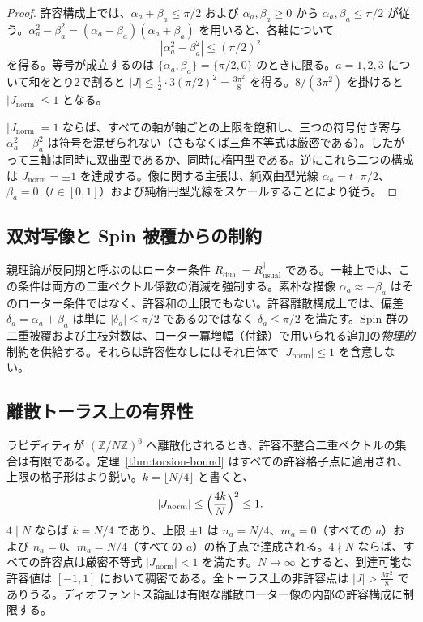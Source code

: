 \documentclass[a4paper]{article}
\theoremstyle{definition}
\theoremstyle{remark}
\newcommand{\Jnorm}{J_{\mathrm{norm}}}
\newcommand{\Jbound}{\frac{3\pi^2}{8}}
\begin{document}
\begin{proof}
許容構成上では、\(\alpha_a + \beta_a \leq \pi/2\) および \(\alpha_a,\beta_a \geq 0\) から \(\alpha_a,\beta_a \leq \pi/2\) が従う。\(\alpha_a^2 - \beta_a^2 = (\alpha_a - \beta_a)(\alpha_a + \beta_a)\) を用いると、各軸について
\[
|\alpha_a^2 - \beta_a^2| \leq (\pi/2)^2
\]
を得る。等号が成立するのは \(\{\alpha_a,\beta_a\}=\{\pi/2,0\}\) のときに限る。\(a = 1,2,3\) について和をとり2で割ると \(|J| \leq \frac12 \cdot 3(\pi/2)^2 = \Jbound\) を得る。\(8/(3\pi^2)\) を掛けると \(|\Jnorm| \leq 1\) となる。

\(|\Jnorm|=1\) ならば、すべての軸が軸ごとの上限を飽和し、三つの符号付き寄与 \(\alpha_a^2-\beta_a^2\) は符号を混ぜられない（さもなくば三角不等式は厳密である）。したがって三軸は同時に双曲型であるか、同時に楕円型である。逆にこれら二つの構成は \(\Jnorm=\pm 1\) を達成する。像に関する主張は、純双曲型光線 \(\alpha_a=t\cdot\pi/2\)、\(\beta_a=0\)（\(t\in[0,1]\)）および純楕円型光線をスケールすることにより従う。
\end{proof}

\subsection{双対写像と Spin 被覆からの制約}

親理論が反同期と呼ぶのはローター条件 \(R_{\mathrm{dual}}=R_{\mathrm{usual}}^\dagger\) である。一軸上では、この条件は両方の二重ベクトル係数の消滅を強制する。素朴な描像 \(\alpha_a \approx -\beta_a\) はそのローター条件ではなく、許容和の上限でもない。許容離散構成上では、偏差 \(\delta_a = \alpha_a + \beta_a\) は単に \(|\delta_a| \leq \pi/2\) であるのではなく \(\delta_a \leq \pi/2\) を満たす。Spin 群の二重被覆および主枝対数は、ローター冪増幅（付録）で用いられる追加の\emph{物理的}制約を供給する。それらは許容性なしにはそれ自体で \(|\Jnorm| \leq 1\) を含意しない。

\subsection{離散トーラス上の有界性}

ラピディティが \((\mathbb{Z}/N\mathbb{Z})^6\) へ離散化されるとき、許容不整合二重ベクトルの集合は有限である。定理~\ref{thm:torsion-bound} はすべての許容格子点に適用され、上限の格子形はより鋭い。\(k=\lfloor N/4\rfloor\) と書くと、
\[
|\Jnorm| \leq \Bigl(\frac{4k}{N}\Bigr)^2 \leq 1.
\]
\(4\mid N\) ならば \(k=N/4\) であり、上限 \(\pm 1\) は \(n_a=N/4\)、\(m_a=0\)（すべての \(a\)）および \(n_a=0\)、\(m_a=N/4\)（すべての \(a\)）の格子点で達成される。\(4\nmid N\) ならば、すべての許容点は厳密不等式 \(|\Jnorm|<1\) を満たす。\(N\to\infty\) とすると、到達可能な許容値は \([-1,1]\) において稠密である。全トーラス上の非許容点は \(|J| > \Jbound\) でありうる。ディオファントス論証は有限な離散ローター像の内部の許容構成に制限する。
\end{document}
